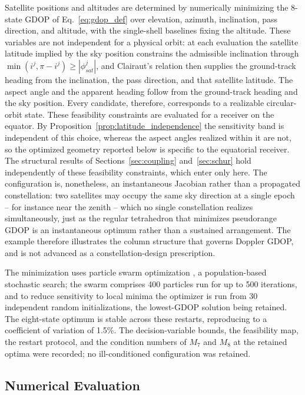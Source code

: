 \documentclass[letterpaper,times]{IONconf-v2}
\theoremstyle{plain}
\theoremstyle{remark}
\begin{document}
Satellite positions and altitudes are determined by numerically minimizing the 8-state GDOP of Eq.~\eqref{eq:gdop_def} over elevation, azimuth, inclination, pass direction, and altitude, with the single-shell baselines fixing the altitude. These variables are not independent for a physical orbit: at each evaluation the satellite latitude implied by the sky position constrains the admissible inclination through $\min(i^j, \pi - i^j) \geq |\phi_{sat}^j|$, and Clairaut's relation \parencite{Geyer2016} then supplies the ground-track heading from the inclination, the pass direction, and that satellite latitude. The aspect angle and the apparent heading follow from the ground-track heading and the sky position. Every candidate, therefore, corresponds to a realizable circular-orbit state. These feasibility constraints are evaluated for a receiver on the equator. By Proposition~\ref{prop:latitude_independence} the sensitivity band is independent of this choice, whereas the aspect angles realized within it are not, so the optimized geometry reported below is specific to the equatorial receiver. The structural results of Sections~\ref{sec:coupling} and~\ref{sec:schur} hold independently of these feasibility constraints, which enter only here. The configuration is, nonetheless, an instantaneous Jacobian rather than a propagated constellation: two satellites may occupy the same sky direction at a single epoch -- for instance near the zenith -- which no single constellation realizes simultaneously, just as the regular tetrahedron that minimizes pseudorange GDOP is an instantaneous optimum rather than a sustained arrangement. The example therefore illustrates the column structure that governs Doppler GDOP, and is not advanced as a constellation-design prescription.

The minimization uses particle swarm optimization \parencite{Kennedy1995}, a population-based stochastic search; the swarm comprises 400 particles run for up to 500 iterations, and to reduce sensitivity to local minima the optimizer is run from 30 independent random initializations, the lowest-GDOP solution being retained. The eight-state optimum is stable across these restarts, reproducing to a coefficient of variation of 1.5\%. The decision-variable bounds, the feasibility map, the restart protocol, and the condition numbers of $M_7$ and $M_8$ at the retained optima were recorded; no ill-conditioned configuration was retained.

\subsection{Numerical Evaluation}\label{subsec:example_eval}
\end{document}
